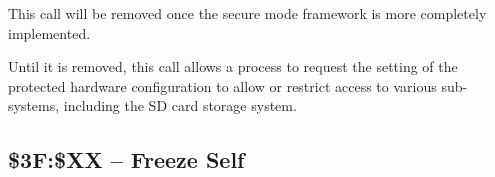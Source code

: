 This call will be removed once the secure mode framework is more completely implemented.

Until it is removed, this call allows a process to request the setting of the protected hardware configuration to allow or restrict access to various sub-systems, including the SD card storage system.

\subsection{\$3F:\$XX -- Freeze Self}

